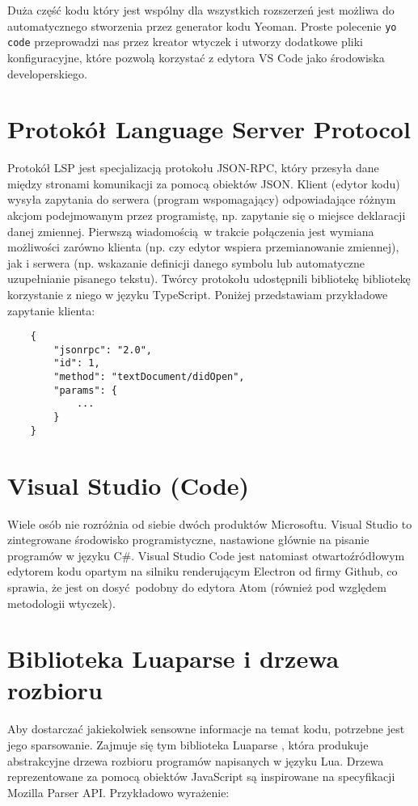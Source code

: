 Duża część kodu który jest wspólny dla wszystkich rozszerzeń jest możliwa do automatycznego stworzenia przez generator kodu Yeoman. Proste polecenie \texttt{yo code} przeprowadzi nas przez kreator wtyczek i utworzy dodatkowe pliki konfiguracyjne, które pozwolą korzystać z edytora VS Code jako środowiska developerskiego.

\section{Protokół Language Server Protocol}
Protokół LSP \cite{docs} jest specjalizacją protokołu JSON-RPC, który przesyła dane między stronami komunikacji za pomocą obiektów JSON. Klient (edytor kodu) wysyła zapytania do serwera (program wspomagający) odpowiadające różnym akcjom podejmowanym przez programistę, np. zapytanie się o miejsce deklaracji danej zmiennej. Pierwszą wiadomością w trakcie połączenia jest wymiana możliwości zarówno klienta (np. czy edytor wspiera przemianowanie zmiennej), jak i serwera (np. wskazanie definicji danego symbolu lub automatyczne uzupełnianie pisanego tekstu). Twórcy protokołu udostępnili bibliotekę bibliotekę korzystanie z niego w języku TypeScript. Poniżej przedstawiam przykładowe zapytanie klienta:

\begin{lstlisting}
    {
        "jsonrpc": "2.0",
        "id": 1,
        "method": "textDocument/didOpen",
        "params": {
            ...
        }
    }
\end{lstlisting}

\section{Visual Studio (Code)}
Wiele osób nie rozróżnia od siebie dwóch produktów Microsoftu. Visual Studio to zintegrowane środowisko programistyczne, nastawione głównie na pisanie programów w języku C\#. Visual Studio Code jest natomiast otwartoźródłowym edytorem kodu opartym na silniku renderującym Electron od firmy Github, co sprawia, że jest on dosyć podobny do edytora Atom (również pod względem metodologii wtyczek). 

\section{Biblioteka Luaparse i drzewa rozbioru}
Aby dostarczać jakiekolwiek sensowne informacje na temat kodu, potrzebne jest jego sparsowanie. Zajmuje się tym biblioteka Luaparse \cite{luaparse}, która produkuje abstrakcyjne drzewa rozbioru programów napisanych w języku Lua. Drzewa reprezentowane za pomocą obiektów JavaScript są inspirowane na specyfikacji Mozilla Parser API. Przykładowo wyrażenie:


